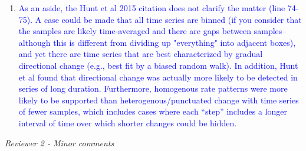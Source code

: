\documentclass[12pt,letterpaper]{article}
\renewcommand{\subsection}[1]{%
\bigskip
\begin{center}
\begin{large}
\normalfont\itshape #1
\end{large}
\end{center}}
\begin{document}
\begin{enumerate}



\item{\textcolor{blue}{As an aside, the Hunt et al 2015 citation does not clarify the matter (line 74-75). A case could be made that all time series are binned (if you consider that the samples are likely time-averaged and there are gaps between samples--although this is different from dividing up "everything" into adjacent boxes), and yet there are time series that are best characterized by gradual directional change (e.g., best fit by a biased random walk). In addition, Hunt et al found that directional change was actually more likely to be detected in series of long duration. Furthermore, homogenous rate patterns were more likely to be supported than heterogenous/punctuated change with time series of fewer samples, which includes cases where each ``step'' includes a longer interval of time over which shorter changes could be hidden.}}



\end{enumerate}

\subsection{Reviewer 2 - Minor comments}
\end{document}
